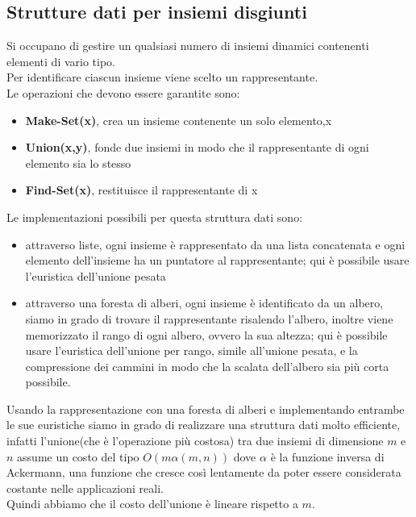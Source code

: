 \documentclass[]{article}
\begin{document}
\subsection{Strutture dati per insiemi disgiunti}
Si occupano di gestire un qualsiasi numero di insiemi dinamici contenenti elementi di vario tipo.\\
Per identificare ciascun insieme viene scelto un rappresentante.\\
Le operazioni che devono essere garantite sono:
\begin{itemize}
\item \textbf{Make-Set(x)}, crea un insieme contenente un solo elemento,x
\item \textbf{Union(x,y)}, fonde due insiemi in modo che il rappresentante di ogni elemento sia lo stesso 
\item \textbf{Find-Set(x)}, restituisce il rappresentante di x
\end{itemize}
Le implementazioni possibili per questa struttura dati sono:
\begin{itemize}
\item attraverso liste, ogni insieme è rappresentato da una lista concatenata e ogni elemento dell'insieme ha un puntatore al rappresentante; qui è possibile usare l'euristica dell'unione pesata
\item attraverso una foresta di alberi, ogni insieme è identificato da un albero, siamo in grado di trovare il rappresentante risalendo l'albero, inoltre viene memorizzato il rango di ogni albero, ovvero la sua altezza; qui è possibile usare l'euristica dell'unione per rango, simile all'unione pesata, e la compressione dei cammini in modo che la scalata dell'albero sia più corta possibile.
\end{itemize}
Usando la rappresentazione con una foresta di alberi e implementando entrambe le sue euristiche siamo in grado di realizzare una struttura dati molto efficiente, infatti l'unione(che è l'operazione più costosa) tra due insiemi di dimensione $m$ e $n$ assume un costo del tipo $O(m\alpha (m,n))$ dove $\alpha$ è la funzione inversa di Ackermann, una funzione che cresce così lentamente da poter essere considerata costante nelle applicazioni reali.\\
Quindi abbiamo che il costo dell'unione è lineare rispetto a $m$.\\
\end{document}
